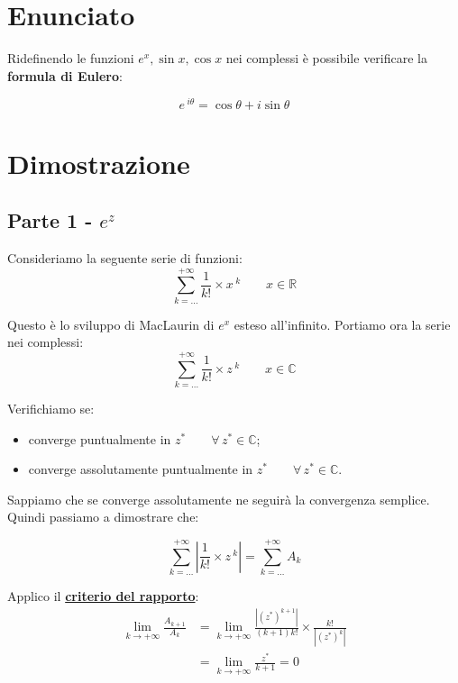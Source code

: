 \documentclass[../dimostrazioni]{subfiles}
\begin{document}
        \section*{Enunciato}

            Ridefinendo le funzioni \( e^x, \sin x, \cos x \) nei complessi è possibile verificare la \textbf{formula di Eulero}:

                \[  e\,^{i\theta} = \cos \theta + i \sin \theta \]

        \section*{Dimostrazione}

            \subsection*{Parte 1 - \(e^z\)}    

                Consideriamo la seguente serie di funzioni:
                \[  \sum_{k=\dots}^{+\infty} \frac{1}{k!} \times x\,^k \qquad x \in \mathbb{R}  \]

                Questo è lo sviluppo di MacLaurin di \(e^x\) esteso all'infinito. Portiamo ora la serie nei complessi:
                \[  \sum_{k=\dots}^{+\infty} \frac{1}{k!} \times z\,^k \qquad x \in \mathbb{C}  \]

                Verifichiamo se:
                \begin{itemize}
                    \item converge puntualmente in \(z^* \qquad \forall \, z^*  \in \mathbb{C}\);
                    \item converge assolutamente puntualmente in \(z^* \qquad \forall \, z^*  \in \mathbb{C}\).
                \end{itemize}
            
                Sappiamo che se converge assolutamente ne seguirà la convergenza semplice. Quindi passiamo a dimostrare che:

                \[  \sum_{k=\dots}^{+\infty} \left| \frac{1}{k!} \times z\,^k \right| = \sum_{k=\dots}^{+\infty} A_k \]

                Applico il \textbf{\hyperref[criterioRapportoSerie]{criterio del rapporto}}:
                \begin{align*}
                    \lim_{k \to +\infty} \frac{A_{k+1}}{A_k} &= \lim_{k \to +\infty} \frac{\left|(z^*)^{k+1}\right|}{(k+1)k!} \times \frac{k!}{\left|(z^*)^k\right|} \\
                    &= \lim_{k \to +\infty} \frac{z^*}{k+1} = 0
                \end{align*}
\end{document}
